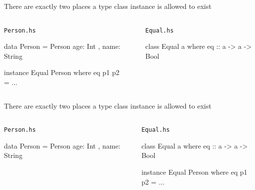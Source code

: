 \documentclass[usenames,dvipsnames,svgnames,table,aspectratio=169,mathserif]{beamer}
\newcommand{\nl}{\vspace{\baselineskip}}
\begin{document}
\begin{frame}[fragile]

There are exactly two places a type class instance is allowed to exist

\nl

\begin{columns}
\begin{column}[T]{0.49\textwidth}
\begin{block}{\tt Person.hs}
\begin{haskellcode}
data Person = Person
  { age: Int
  , name: String }

instance Equal Person where
  eq p1 p2 = ...
\end{haskellcode}
\end{block}
\end{column}
\begin{column}{0.02\textwidth}
\end{column}
\begin{column}[T]{0.49\textwidth}
\begin{block}{\tt Equal.hs}
\begin{haskellcode}
class Equal a where
  eq :: a -> a -> Bool
\end{haskellcode}
\end{block}
\end{column}
\end{columns}

\end{frame}


\begin{frame}[fragile]

There are exactly two places a type class instance is allowed to exist

\nl

\begin{columns}
\begin{column}[T]{0.49\textwidth}
\begin{block}{\tt Person.hs}
\begin{haskellcode}
data Person = Person
  { age: Int
  , name: String }
\end{haskellcode}
\end{block}
\end{column}
\begin{column}{0.02\textwidth}
\end{column}
\begin{column}[T]{0.49\textwidth}
\begin{block}{\tt Equal.hs}
\begin{haskellcode}
class Equal a where
  eq :: a -> a -> Bool


instance Equal Person where
  eq p1 p2 = ...
\end{haskellcode}
\end{block}
\end{column}
\end{columns}

\end{frame}
\end{document}
